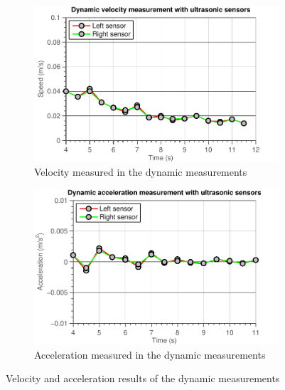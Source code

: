 \documentclass[11pt,titlepage]{report}
\begin{document}
\begin{figure}[H]
	\begin{subfigure}{.5\textwidth}
		\begin{center}
			\includegraphics[width=\linewidth]{resource/speed-rc.pdf}
		\end{center}
		\caption{Velocity measured in the dynamic measurements}
		\label{fig:ass-2-dyn-vel}
	\end{subfigure}
	\begin{subfigure}{.5\textwidth}
		\begin{center}
			\includegraphics[width=\linewidth]{resource/acceleration-rc.pdf}
		\end{center}
		\caption{Acceleration measured in the dynamic measurements}
		\label{fig:ass-2-dyn-acc}
	\end{subfigure}
	\caption{Velocity and acceleration results of the dynamic measurements}
\end{figure}
\end{document}
